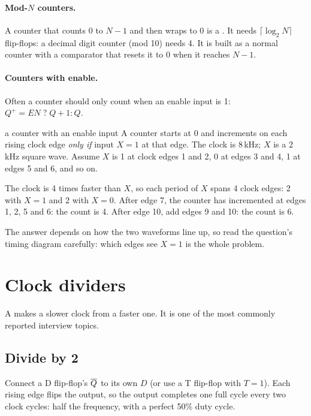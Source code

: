 \paragraph{Mod-$N$ counters.} A counter that counts $0$ to $N-1$ and then wraps to 0 is a . It needs $\lceil \log_2 N \rceil$ flip-flops: a decimal digit counter (mod 10) needs 4. It is built as a normal counter with a comparator that resets it to 0 when it reaches $N - 1$.

\paragraph{Counters with enable.} Often a counter should only count when an enable input is 1: $Q^+ = EN\;?\;Q+1 : Q$.

\begin{worked}{a counter with an enable input}
A counter starts at 0 and increments on each rising clock edge \emph{only if} input $X = 1$ at that edge. The clock is 8\,kHz; $X$ is a 2\,kHz square wave. Assume $X$ is 1 at clock edges 1 and 2, 0 at edges 3 and 4, 1 at edges 5 and 6, and so on.

The clock is 4 times faster than $X$, so each period of $X$ spans 4 clock edges: 2 with $X = 1$ and 2 with $X = 0$. After edge 7, the counter has incremented at edges 1, 2, 5 and 6: the count is 4. After edge 10, add edges 9 and 10: the count is 6.
\end{worked}

The answer depends on how the two waveforms line up, so read the question's timing diagram carefully: which edges see $X = 1$ is the whole problem.

\section{Clock dividers}

A  makes a slower clock from a faster one. It is one of the most commonly reported interview topics.

\subsection*{Divide by 2}

Connect a D flip-flop's $\overline{Q}$ to its own $D$ (or use a T flip-flop with $T = 1$). Each rising edge flips the output, so the output completes one full cycle every two clock cycles: half the frequency, with a perfect 50\% duty cycle.

